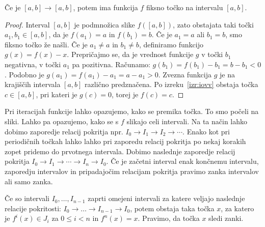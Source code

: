 \documentclass[mat2]{fmfdelo}
\begin{document}
\begin{lema}\label{lem:1zanka}
Če je $[a, b] \to [a, b]$, potem ima funkcija $f$ fiksno točko na intervalu $[a, b]$.
\end{lema}
\begin{proof}
Interval $[a, b]$ je podmnožica slike $f([a, b])$, zato obstajata taki točki $a_1, b_1 \in [a, b]$, da je $f(a_1)=a$ in $f(b_1)=b$. Če je $a_1 = a$ ali $b_1 = b$, smo fiksno točko že našli. Če je $a_1 \neq a$ in $b_1 \neq b$, definiramo funkcijo $g(x) = f(x) - x$. Prepričajmo se, da je vrednost funkcije $g$ v točki $b_1$ negativna, v točki $a_1$ pa pozitivna. Računamo:
$g(b_1) = f(b_1) - b_1 = b - b_1 < 0$. Podobno je
$g(a_1) = f(a_1) - a_1 = a - a_1 > 0$.
Zvezna funkcija $g$ je na krajiščih intervala $[a, b]$ različno predznačena. Po izreku~\ref{izr:iovv} obstaja točka $c \in [a, b]$, pri kateri je $g(c)=0$, torej je $f(c) = c$.
\end{proof}
Pri iteracijah funkcije lahko opazujemo, kako se premika točka. To smo počeli na sliki. Lahko pa opazujemo, kako se s $f$ slikajo celi intervali. Na ta način lahko dobimo zaporedje relacij pokritja npr. $I_0 \to I_1 \to I_2 \to \cdots $. Enako kot pri periodičnih točkah lahko lahko pri zaporedu relacij pokritja po nekaj korakih zopet pridemo do prvotnega intervala. Dobimo naslednje zaporedje relacij pokritja $I_0 \to I_1 \to \cdots \to I_n \to I_0$. Če je začetni interval enak končnemu intervalu, zaporedju intervalov in pripadajočim relacijam pokritja pravimo zanka intervalov ali samo zanka.

\begin{lema}\label{lem:zanka}
Če so intervali $I_0, \dots, I_{n-1}$ zaprti omejeni intervali za katere veljajo naslednje relacije pokritosti: $I_0 \to \dots \to I_{n-1} \to I_0$, potem obstaja taka točka $x$, za katero je $f^{i}(x) \in J_i$ za $0 \leq i < n$ in $f^n(x)=x$. Pravimo, da točka $x$ sledi zanki.
\end{lema}
\end{document}
